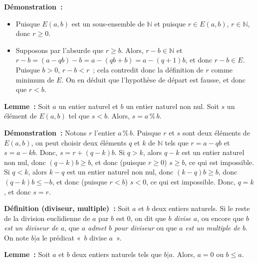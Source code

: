 \medskip

\noindent\textbf{Démonstration :} 
\begin{itemize}[nosep]
    \item Puisque $E(a,b)$ est un sous-ensemble de $\mathbb{N}$ et puisque $r \in E(a,b)$, $r \in \mathbb{N}$, donc $r \geq 0$.
    \item Supposons par l'absurde que $r \geq b$. 
        Alors, $r - b \in \mathbb{N}$ et $r - b = (a - q b) - b = a - (q b + b) = a - (q+1) b$, et donc $r - b \in E$. 
        Puisque $b > 0$, $r - b < r$ ; cela contredit donc la définition de $r$ comme minimum de $E$. 
        On en déduit que l'hypothèse de départ est fausse, et donc que $r < b$.
\end{itemize}

\done

\medskip

\noindent\textbf{Lemme :} Soit $a$ un entier naturel et $b$ un entier naturel non nul.
    Soit $s$ un élément de $E(a,b)$ tel que $s < b$.
    Alors, $s = a \mathrel{\%} b$.

\medskip

\noindent\textbf{Démonstration :} 
    Notons $r$ l'entier $a \mathrel{\%} b$.
    Puisque $r$ et $s$ sont deux éléments de $E(a,b)$, on peut choisir deux éléments $q$ et $k$ de $\mathbb{N}$ tels que $r = a - q b$ et $s = a - k b$. 
    Donc, $s = r + (q-k) b$. 
    Si $q > k$, alors $q-k$ est un entier naturel non nul, donc $(q-k) b \geq b$, et donc (puisque $r \geq 0$) $s \geq b$, ce qui est impossible.
    Si $q < k$, alors $k-q$ est un entier naturel non nul, donc $(k-q) b \geq b$, donc $(q-k) b \leq -b$, et donc (puisque $r < b$) $s < 0$, ce qui est impossible. 
    Donc, $q = k$, et donc $s = r$.

    \done

\medskip

\noindent\textbf{Définition (diviseur, multiple) :} 
    Soit $a$ et $b$ deux entiers naturels.
    Si le reste de la division euclidienne de $a$ par $b$ est $0$, on dit que \textit{$b$ divise $a$}, ou encore que \textit{$b$ est un diviseur de $a$}, que \textit{$a$ admet $b$ pour diviseur} ou que \textit{$a$ est un multiple de $b$}. 
    On note $b \vert a$ le prédicat « $b$ divise $a$ ».

\medskip

\noindent\textbf{Lemme :} 
    Soit $a$ et $b$ deux entiers naturels tels que $b \vert a$.
    Alors, $a = 0$ ou $b \leq a$.

\medskip


